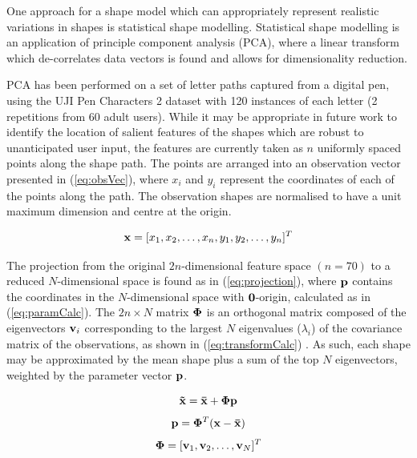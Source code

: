 \documentclass{sig-alternate}
\begin{document}
One approach for a shape model which can appropriately represent realistic
variations in shapes is statistical shape
modelling. Statistical shape modelling is an application of principle component
analysis (PCA), where a linear transform which de-correlates data vectors is
found \cite{Stegmann2002} and allows for dimensionality reduction. 

PCA has been performed on a set of letter paths captured from a digital pen,
using the UJI Pen Characters 2 dataset \cite{Llorens2008} with 120 instances of
each letter (2 repetitions from 60 adult users). While it may be appropriate in future work to
identify the location of salient features of the shapes which are robust to unanticipated user input,
the features are currently taken as $n$ uniformly spaced points along the shape
path. The
points are arranged into an observation vector presented in (\ref{eq:obsVec}),
where $x_i$ and $y_i$ represent the coordinates of each of the points along the
path. The observation shapes are normalised to have a unit maximum dimension 
and centre at the origin.

\begin{equation}\label{eq:obsVec}
{\bf x} = [x_1, x_2, \ldots, x_n, y_1, y_2, \ldots, y_n]^T
\end{equation}


The projection from the original $2n$-dimensional feature space $(n=70)$ to a reduced
$N$-dimensional space is found as in (\ref{eq:projection}), where ${\bf p}$
contains the coordinates in the $N$-dimensional space with ${\bf 0}$-origin,
calculated as in (\ref{eq:paramCalc}). The $2n\times N$ matrix ${\bf \Phi }$ is
an orthogonal matrix composed of the eigenvectors ${\bf v}_i$ corresponding to
the largest $N$ eigenvalues ($\lambda_i$) of the covariance matrix of the
observations, as shown in (\ref{eq:transformCalc}) \cite{Stegmann2002}. As such,
each shape may be approximated by the mean shape plus a sum of the top $N$
eigenvectors, weighted by the parameter vector ${\bf p}$. 

\begin{equation}\label{eq:projection}
{\bf \tilde{x}=\bar{x}+\Phi p}
\end{equation}
\begin{equation}\label{eq:paramCalc}
{\bf p} ={\bf \Phi}^T ({\bf {x}-\bar{x}})
\end{equation}
\begin{equation}\label{eq:transformCalc}
{\bf \Phi} = [{\bf v}_1, {\bf v}_2, \ldots, {\bf v}_N]^T
\end{equation}
\end{document}
